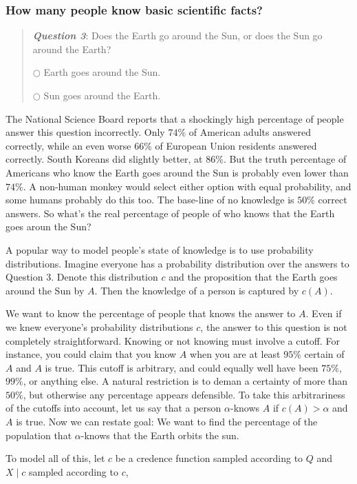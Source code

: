 \subsubsection{How many people know basic scientific facts?}
\begin{quote}
\textbf{\emph{Question 3}}: Does the Earth go around the Sun, or does
the Sun go around the Earth?

\medskip

$\bigcirc$ Earth goes around the Sun.

$\bigcirc$ Sun goes around the Earth.
\end{quote}
The National Science Board \citeyear[Table 7-8]{National_Science_Board2014-yl}
reports that a shockingly high percentage of people answer this question
incorrectly. Only $74$\% of American adults answered correctly, while
an even worse $66$\% of European Union residents answered correctly.
South Koreans did slightly better, at $86$\%. But the truth percentage
of Americans who know the Earth goes around the Sun is probably even
lower than $74$\%. A non-human monkey would select either option
with equal probability, and some humans probably do this too. The
base-line of no knowledge is $50$\% correct answers. So what's the
real percentage of people of who knows that the Earth goes aroun the
Sun? 

A popular way to model people's state of knowledge is to use probability
distributions. Imagine everyone has a probability distribution over
the answers to Question 3. Denote this distribution $c$ and the proposition
that the Earth goes around the Sun by $A$. Then the knowledge of
a person is captured by $c(A)$. 

We want to know the percentage of people that knows the answer to
$A$. Even if we knew everyone's probability distributions $c$, the
answer to this question is not completely straightforward. Knowing
or not knowing must involve a cutoff. For instance, you could claim
that you know $A$ when you are at least $95\%$ certain of $A$ and
$A$ is true. This cutoff is arbitrary, and could equally well have
been $75\%$, $99\%$, or anything else. A natural restriction is
to deman a certainty of more than $50\%$, but otherwise any percentage
appears defensible. To take this arbitrariness of the cutoffs into
account, let us say that a person $\alpha$-knows $A$ if $c(A)>\alpha$
and $A$ is true. Now we can restate goal: We want to find the percentage
of the population that $\alpha$-knows that the Earth orbits the sun.

To model all of this, let $c$ be a credence function sampled according
to $Q$ and $X\mid c$ sampled according to $c$,

